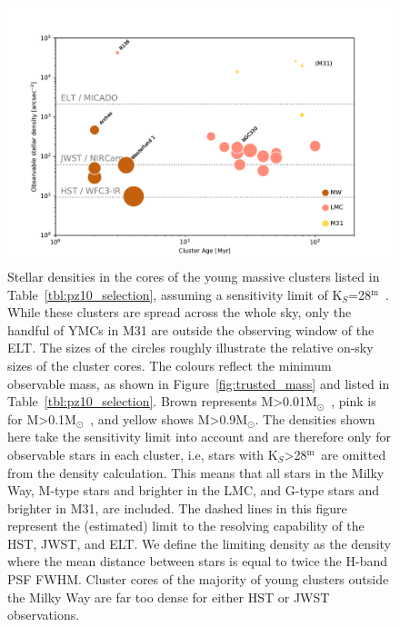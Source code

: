 \documentclass[referee]{aa}
\newcommand{\m}{$^\mathrm{m}$~}
\newcommand{\msun}{M$_\odot$~}
\newcommand{\msune}{M$_\odot$}
\begin{document}
\begin{figure}

    \centering
    \includegraphics[width=\textwidth]{star_density_vs_age.pdf}

    \caption{
    Stellar densities in the cores of the young massive clusters listed in Table~\ref{tbl:pz10_selection}, assuming a sensitivity limit of K$_S$=28\m.
    While these clusters are spread across the whole sky, only the handful of YMCs in M31 are outside the observing window of the ELT.
    The sizes of the circles roughly illustrate the relative on-sky sizes of the cluster cores.
    The colours reflect the minimum observable mass, as shown in Figure~\ref{fig:trusted_mass} and listed in Table~\ref{tbl:pz10_selection}.
    Brown represents M\textgreater0.01\msun, pink is for M\textgreater0.1\msun, and yellow shows M\textgreater0.9\msune.
    The densities shown here take the sensitivity limit into account and are therefore only for observable stars in each cluster, i.e, stars with K$_S$\textgreater28\m are omitted from the density calculation.
    This means that all stars in the Milky Way, M-type stars and brighter in the LMC, and G-type stars and brighter in M31, are included.
    The dashed lines in this figure represent the (estimated) limit to the resolving capability of the HST, JWST, and ELT.
    We define the limiting density as the density where the mean distance between stars is equal to twice the H-band PSF FWHM.
    Cluster cores of the majority of young clusters outside the Milky Way are far too dense for either HST or JWST observations. }

    \label{fig:star_density_vs_age}

\end{figure}
\end{document}
